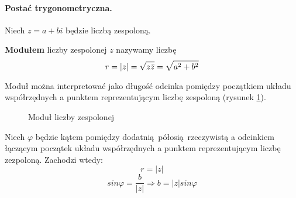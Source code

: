 \paragraph{Postać trygonometryczna.} Niech $z = a+bi$ będzie liczbą zespoloną.
\begin{definition}
    \textbf{Modułem} liczby zespolonej $z$ nazywamy liczbę
    \begin{equation*}
        r = \mathopen|z\mathclose| = \sqrt{z\bar{z}} = \sqrt{a^2+b^2}
    \end{equation*}
\end{definition}
Moduł można interpretować jako długość odcinka pomiędzy początkiem układu współrzędnych a punktem reprezentującym liczbę zespoloną (rysunek \ref{fig:modul_lby_zespolonej}).
\begin{figure}[tbp!]
    \centering
    \caption{Moduł liczby zespolonej}
    \label{fig:modul_lby_zespolonej}
    \vspace{3mm}
\end{figure}
Niech $\varphi$ będzie kątem pomiędzy dodatnią półosią rzeczywistą a odcinkiem łączącym początek układu współrzędnych a punktem reprezentującym liczbę zezpoloną. Zachodzi wtedy:
\begin{equation*}
    r = \mathopen|z\mathclose|
\end{equation*}
\begin{equation*}
    sin \varphi = \frac{b}{\mathopen|z\mathclose|} \Longrightarrow b = \mathopen|z\mathclose| sin \varphi
\end{equation*}
